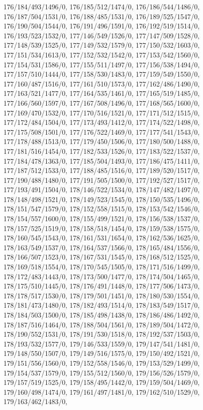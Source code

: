 {176/184/493/1496/0,%
176/185/512/1474/0,%
176/186/544/1486/0,%
176/187/504/1531/0,%
176/188/485/1531/0,%
176/189/525/1547/0,%
176/190/504/1544/0,%
176/191/496/1591/0,%
176/192/519/1514/0,%
176/193/523/1532/0,%
177/146/549/1526/0,%
177/147/509/1528/0,%
177/148/539/1525/0,%
177/149/532/1579/0,%
177/150/532/1603/0,%
177/151/534/1613/0,%
177/152/532/1542/0,%
177/153/542/1560/0,%
177/154/531/1586/0,%
177/155/511/1497/0,%
177/156/538/1494/0,%
177/157/510/1444/0,%
177/158/530/1483/0,%
177/159/549/1550/0,%
177/160/487/1516/0,%
177/161/510/1573/0,%
177/162/486/1490/0,%
177/163/521/1477/0,%
177/164/535/1461/0,%
177/165/519/1485/0,%
177/166/560/1597/0,%
177/167/508/1496/0,%
177/168/565/1600/0,%
177/169/470/1532/0,%
177/170/516/1521/0,%
177/171/512/1515/0,%
177/172/484/1504/0,%
177/173/493/1412/0,%
177/174/522/1498/0,%
177/175/508/1501/0,%
177/176/522/1469/0,%
177/177/541/1543/0,%
177/178/488/1513/0,%
177/179/450/1506/0,%
177/180/500/1488/0,%
177/181/516/1454/0,%
177/182/533/1526/0,%
177/183/522/1537/0,%
177/184/478/1363/0,%
177/185/504/1493/0,%
177/186/475/1411/0,%
177/187/512/1533/0,%
177/188/485/1516/0,%
177/189/520/1517/0,%
177/190/488/1480/0,%
177/191/505/1500/0,%
177/192/527/1517/0,%
177/193/491/1504/0,%
178/146/522/1534/0,%
178/147/482/1497/0,%
178/148/498/1521/0,%
178/149/523/1545/0,%
178/150/535/1496/0,%
178/151/547/1579/0,%
178/152/558/1515/0,%
178/153/542/1546/0,%
178/154/557/1600/0,%
178/155/499/1521/0,%
178/156/538/1537/0,%
178/157/525/1519/0,%
178/158/518/1454/0,%
178/159/538/1575/0,%
178/160/545/1543/0,%
178/161/531/1654/0,%
178/162/536/1625/0,%
178/163/549/1537/0,%
178/164/537/1566/0,%
178/165/484/1556/0,%
178/166/507/1523/0,%
178/167/531/1545/0,%
178/168/512/1525/0,%
178/169/518/1554/0,%
178/170/545/1505/0,%
178/171/516/1499/0,%
178/172/483/1443/0,%
178/173/500/1477/0,%
178/174/504/1465/0,%
178/175/510/1445/0,%
178/176/491/1448/0,%
178/177/506/1473/0,%
178/178/517/1530/0,%
178/179/501/1451/0,%
178/180/530/1554/0,%
178/181/473/1480/0,%
178/182/493/1514/0,%
178/183/549/1517/0,%
178/184/503/1500/0,%
178/185/498/1438/0,%
178/186/486/1492/0,%
178/187/516/1464/0,%
178/188/504/1561/0,%
178/189/504/1472/0,%
178/190/552/1531/0,%
178/191/530/1518/0,%
178/192/537/1503/0,%
178/193/532/1577/0,%
179/146/533/1559/0,%
179/147/541/1481/0,%
179/148/550/1507/0,%
179/149/516/1575/0,%
179/150/492/1521/0,%
179/151/556/1560/0,%
179/152/558/1546/0,%
179/153/529/1499/0,%
179/154/537/1579/0,%
179/155/512/1560/0,%
179/156/526/1579/0,%
179/157/519/1525/0,%
179/158/495/1442/0,%
179/159/504/1469/0,%
179/160/498/1474/0,%
179/161/497/1481/0,%
179/162/510/1529/0,%
179/163/462/1483/0,%
}
